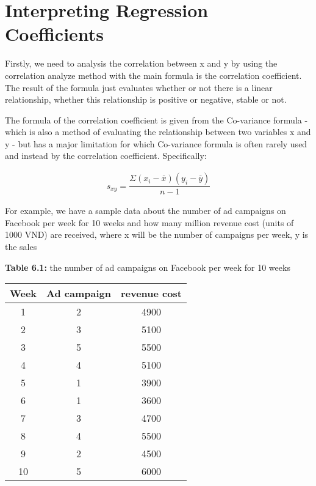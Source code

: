 \documentclass{article}
\begin{document}
\section {Interpreting Regression Coefficients} 
    Firstly, we need to analysis the correlation between x and y by using the correlation analyze method with the main formula is the correlation coefficient. The result of the formula just evaluates whether or not there is a linear relationship, whether this relationship is positive or negative, stable or not.  
    
    The formula of the correlation coefficient is given from the Co-variance formula - which is also a method of evaluating the relationship between two variables x and y - but has a major limitation for which Co-variance formula is often rarely used and instead by the correlation coefficient. Specifically:
    
    \begin{align} 
        s_{xy} = \dfrac{\Sigma{(x_{i} - \overline{x})(y_{i} - \overline{y})}}{n - 1}\nonumber
    \end{align}
    
    For example, we have a sample data about the number of ad campaigns on Facebook per week for 10 weeks and how many million revenue cost (units of 1000 VND) are received, where x will be the number of campaigns per week, y is the sales


    \begin{center}
        \textbf{Table 6.1:} the number of ad campaigns on Facebook per week for 10 weeks
        
        \begin{tabular}{|c|c|c|}
            \hline 
            Week & Ad campaign & revenue cost  \\
            \hline
                1 & 2 & 4900 \\
                2 & 3 & 5100 \\ 
                3 & 5 & 5500 \\
                4 & 4 & 5100 \\
                5 & 1 & 3900 \\
                6 & 1 & 3600 \\
                7 & 3 & 4700 \\
                8 & 4 & 5500 \\
                9 & 2 & 4500 \\ 
                10 & 5 & 6000 \\
            \hline
        \end{tabular}
    \end{center}
    
\end{document}
